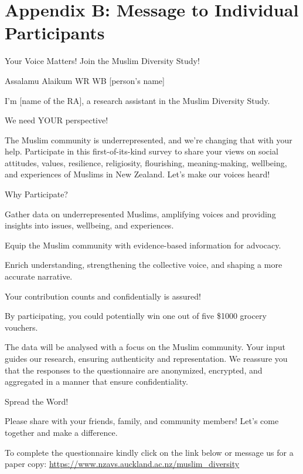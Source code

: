 \documentclass[
]{interact}
\begin{document}
\newpage{}

\section{Appendix B: Message to Individual
Participants}\label{appendix-b-message-to-individual-participants}

Your Voice Matters! Join the Muslim Diversity Study!

\noindent Assalamu Alaikum WR WB {[}person's name{]}

\noindent I'm {[}name of the RA{]}, a research assistant in the Muslim
Diversity Study.

\noindent We need YOUR perspective!

\noindent The Muslim community is underrepresented, and we're changing
that with your help. Participate in this first-of-its-kind survey to
share your views on social attitudes, values, resilience, religiosity,
flourishing, meaning-making, wellbeing, and experiences of Muslims in
New Zealand. Let's make our voices heard!

\noindent Why Participate?

\noindent Gather data on underrepresented Muslims, amplifying voices and
providing insights into issues, wellbeing, and experiences.

\noindent Equip the Muslim community with evidence-based information for
advocacy.

\noindent Enrich understanding, strengthening the collective voice, and
shaping a more accurate narrative.

\noindent Your contribution counts and confidentially is assured!

\noindent By participating, you could potentially win one out of five
\$1000 grocery vouchers.

\noindent The data will be analysed with a focus on the Muslim
community. Your input guides our research, ensuring authenticity and
representation. We reassure you that the responses to the questionnaire
are anonymized, encrypted, and aggregated in a manner that ensure
confidentiality.

\noindent Spread the Word!

\noindent Please share with your friends, family, and community members!
Let's come together and make a difference.

\noindent To complete the questionnaire kindly click on the link below
or message us for a paper copy:
\url{https://www.nzavs.auckland.ac.nz/muslim_diversity}
\end{document}
